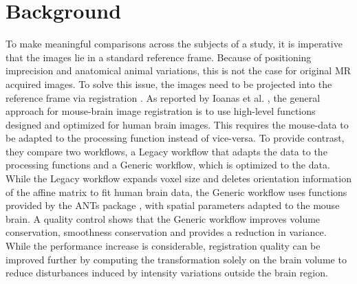 \section{Background}
To make meaningful comparisons across the subjects of a study, it is imperative that the images lie in a standard reference frame.
Because of positioning imprecision and anatomical animal variations, this is not the case for original MR acquired images.
To solve this issue, the images need to be projected into the reference frame via registration \cite{maintz_overview_nodate, sotiras_deformable_2013}.
As reported by Ioanas et al. \cite{ioanas_optimized_2019}, the general approach for mouse-brain image registration is to use high-level functions designed and optimized for human brain images.
This requires the mouse-data to be adapted to the processing function instead of vice-versa.
To provide contrast, they compare two workflows, a Legacy workflow that adapts the data to the processing functions and a Generic workflow, which is optimized to the data.
While the Legacy workflow expands voxel size and deletes orientation information of the affine matrix to fit human brain data, the Generic workflow uses functions provided by the ANTs package \cite{ants}, with spatial parameters adapted to the mouse brain.
A quality control shows that the Generic workflow improves volume conservation, smoothness conservation and provides a reduction in variance.
While the performance increase is considerable, registration quality can be improved further by computing the transformation solely on the brain volume to reduce disturbances induced by intensity variations outside the brain region.

